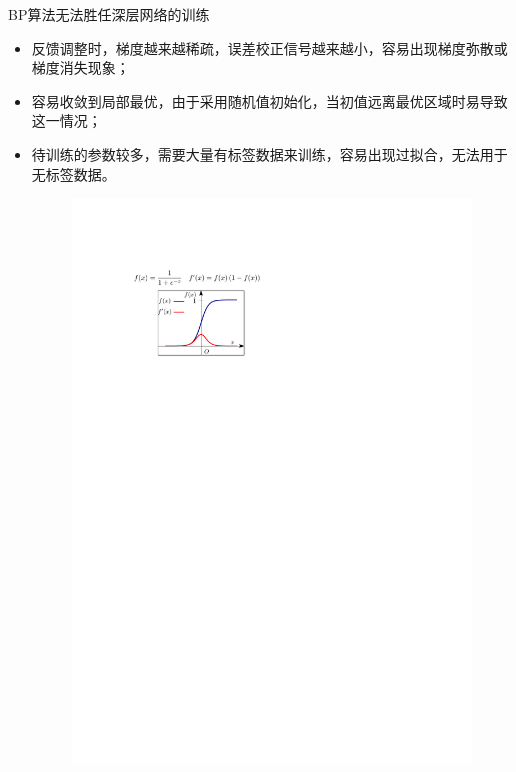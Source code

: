\begin{note}
\begin{enumerate}
        BP算法无法胜任深层网络的训练
        \begin{itemize}
            \item 反馈调整时，梯度越来越稀疏，误差校正信号越来越小，容易出现梯度弥散或梯度消失现象；
            \item 容易收敛到局部最优，由于采用随机值初始化，当初值远离最优区域时易导致这一情况；
            \item 待训练的参数较多，需要大量有标签数据来训练，容易出现过拟合，无法用于无标签数据。
            \begin{figure}[htbp]
                \centering
                \includegraphics{image/梯度消失.pdf}
            \end{figure}
        \end{itemize}
    \end{enumerate}
\end{note}

